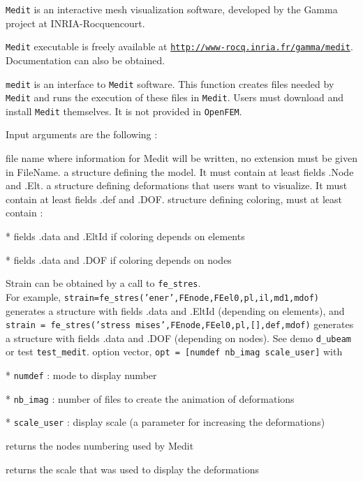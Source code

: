 
{\tt Medit} is an interactive mesh visualization software, developed by the Gamma project at INRIA-Rocquencourt. 

{\tt Medit} executable is freely available at \href{http://www-rocq.inria.fr/gamma/medit}{\tt http://www-rocq.inria.fr/gamma/medit}.
Documentation can also be obtained.

{\tt medit} is an interface to {\tt Medit} software. This function creates files needed by {\tt Medit} and runs the execution of these files in {\tt Medit}. Users must download and install {\tt Medit} themselves. It is not provided in {\tt OpenFEM}.

Input arguments are the following :

file name where information for Medit will be written, no extension must be given in FileName.
a structure defining the model. It must contain at least fields .Node and .Elt.
a structure defining deformations that users want to visualize. It must contain at least fields .def and .DOF.
structure defining coloring, must at least contain :

* fields .data and .EltId  if coloring depends on elements

* fields .data and .DOF    if coloring depends on nodes

Strain can be obtained by a call to {\tt fe\_stres}.\\
For example, {\tt strain=fe\_stres('ener',FEnode,FEel0,pl,il,md1,mdof)} generates a structure with fields .data and .EltId (depending on elements), and {\tt strain = fe\_stres('stress mises',FEnode,FEel0,pl,[],def,mdof)}  generates a structure with fields .data and .DOF (depending on nodes). See demo {\tt d\_ubeam} or test {\tt test\_medit}.
option vector, {\tt opt = [numdef nb\_imag scale\_user]} with 

* {\tt numdef} : mode to display number

* {\tt nb\_imag} : number of files to create the animation of deformations

* {\tt scale\_user}  : display scale (a parameter for increasing the deformations) 

returns the nodes numbering used by Medit 

returns the scale that was used to display the deformations



